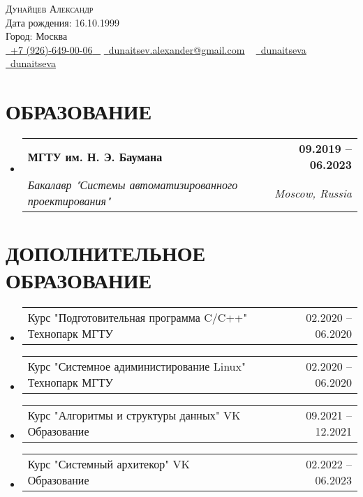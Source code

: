 \documentclass[letterpaper,11pt]{article}
\makeatletter
\newcommand{\resumeSubheading}[4]{
  \vspace{-2pt}\item
    \begin{tabular*}{1.0\textwidth}[t]{l@{\extracolsep{\fill}}r}
      \textbf{\large#1} & \textbf{\small #2} \\
      \textit{\large#3} & \textit{\small #4} \\
      
    \end{tabular*}\vspace{-7pt}
}
\newcommand{\resumeSubheadingAdditional}[2]{
	\vspace{-2pt}\item
	\begin{tabular*}{1.0\textwidth}[t]{l@{\extracolsep{\fill}}r}
		\large#1 & \small #2 \\
		
	\end{tabular*}\vspace{-7pt}
}
\newcommand{\resumeSubHeadingListStart}{\begin{itemize}[leftmargin=0.0in, label={}]}
\newcommand{\resumeSubHeadingListEnd}{\end{itemize}}
\makeatother
\begin{document}


\begin{center}
    {\Huge \scshape Дунайцев Александр} \\ \vspace{1pt}
    Дата рождения: 16.10.1999 \\  Город: Москва \\ \vspace{1pt}
    \small \href{tel:+79266490006}{ \raisebox{-0.1\height}\faPhone\ \underline{+7 (926)-649-00-06} ~} \href{dunaitsev.alexander@gmail.com}{\raisebox{-0.2\height}\faEnvelope\  \underline{dunaitsev.alexander@gmail.com}} ~ 
    \href{https://github.com/dunaitseva}{\raisebox{-0.2\height}\faGithub\ \underline{dunaitseva}} ~
    \href{https://t.me/dunaitseva}{\raisebox{-0.2\height}\faTelegram\ \underline{dunaitseva}} ~
    \vspace{-8pt}
\end{center}


\section{ОБРАЗОВАНИЕ}
  \resumeSubHeadingListStart
  \resumeSubheading
  {МГТУ им. Н. Э. Баумана}{09.2019 -- 06.2023}
  {Бакалавр "Системы автоматизированного проектирования"}{Moscow, Russia}
  \resumeSubHeadingListEnd

\section{ДОПОЛНИТЕЛЬНОЕ ОБРАЗОВАНИЕ}
\resumeSubHeadingListStart
\resumeSubheadingAdditional
{Курс "Подготовительная программа C/C++" Технопарк МГТУ}{02.2020 -- 06.2020}
\resumeSubHeadingListEnd

\resumeSubHeadingListStart
\resumeSubheadingAdditional
{Курс "Системное адиминистирование Linux" Технопарк МГТУ}{02.2020 -- 06.2020}
\resumeSubHeadingListEnd

\resumeSubHeadingListStart
\resumeSubheadingAdditional
{Курс "Алгоритмы и структуры данных" VK Образование}{09.2021 -- 12.2021}
\resumeSubHeadingListEnd

\resumeSubHeadingListStart
\resumeSubheadingAdditional
{Курс "Системный архитекор" VK Образование}{02.2022 -- 06.2023}
\resumeSubHeadingListEnd
\end{document}
